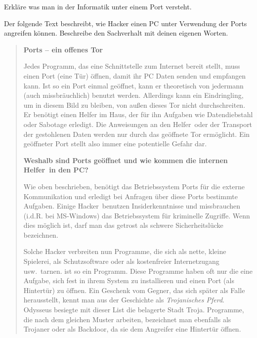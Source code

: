 \begin{compactenum}[a)]
\item Erkläre was man in der Informatik unter einem Port versteht.

\item Der folgende Text beschreibt, wie Hacker einen PC unter Verwendung der
Ports angreifen können. Beschreibe den Sachverhalt mit deinen eigenen Worten.

\begin{quotation}
\noindent \textbf{Ports -- ein offenes Tor}

\noindent
Jedes Programm, das eine Schnittstelle zum Internet bereit stellt, muss einen
Port (eine Tür) öffnen, damit ihr PC Daten senden und empfangen kann. Ist so
ein Port einmal geöffnet, kann er theoretisch von jedermann (auch
missbräuchlich) benutzt werden. Allerdings kann ein Eindringling, um in diesem
Bild zu bleiben, von außen dieses Tor nicht durchschreiten. Er benötigt einen
\glqq Helfer im Haus\grqq , der für ihn Aufgaben wie Datendiebstahl oder
Sabotage erledigt. Die Anweisungen an den \glqq Helfer\grqq\ oder der Transport
der gestohlenen Daten werden nur durch das geöffnete Tor ermöglicht. Ein
geöffneter Port stellt also immer eine potentielle Gefahr dar.

\noindent
\textbf{Weshalb sind Ports geöffnet und wie kommen die internen \glqq
Helfer\grqq\ in den PC?}

\noindent
Wie oben beschrieben, benötigt das Betriebssystem Ports für die externe
Kommunikation und erledigt bei Anfragen über diese Ports bestimmte Aufgaben.
Einige \glqq Hacker\grqq\ benutzen Insiderkenntnisse und missbrauchen (i.d.R.
bei MS-Windows) das Betriebssystem für kriminelle Zugriffe. Wenn dies möglich
ist, darf man das getrost als schwere Sicherheitslücke bezeichnen.

\noindent
Solche Hacker verbreiten nun Programme, die sich als nette, kleine Spielerei,
als Schutzsoftware oder als kostenfreier Internetzugang usw.\ tarnen.
 ist so ein Programm. Diese Programme haben oft nur die
eine Aufgabe, sich fest in ihrem System zu installieren und einen Port (als
Hintertür) zu öffnen. Ein Geschenk vom Gegner, das sich später als Falle
herausstellt, kennt man aus der Geschichte als \emph{Trojanisches Pferd}.
Odysseus besiegte mit dieser List die belagerte Stadt Troja. Programme, die
nach dem gleichen Muster arbeiten, bezeichnet man ebenfalls als Trojaner oder
als \glqq Backdoor\grqq , da sie dem Angreifer eine Hintertür öffnen.


\end{quotation}
\end{compactenum}
